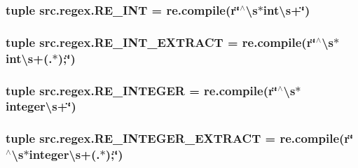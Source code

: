 \hypertarget{namespacesrc_1_1regex_a88a544404f103c3166f2782b063aea3d}{
\subsubsection[{R\-E\-\_\-\-I\-N\-T}]{\setlength{\rightskip}{0pt plus 5cm}tuple src.\-regex.\-R\-E\-\_\-\-I\-N\-T = re.\-compile(r\char`\"{}$^\wedge$\textbackslash{}s$\ast$int\textbackslash{}s+\char`\"{})}}\label{namespacesrc_1_1regex_a88a544404f103c3166f2782b063aea3d}
\hypertarget{namespacesrc_1_1regex_a246819d4a1df3adcc504d309818a23c8}{
\subsubsection[{R\-E\-\_\-\-I\-N\-T\-\_\-\-E\-X\-T\-R\-A\-C\-T}]{\setlength{\rightskip}{0pt plus 5cm}tuple src.\-regex.\-R\-E\-\_\-\-I\-N\-T\-\_\-\-E\-X\-T\-R\-A\-C\-T = re.\-compile(r\char`\"{}$^\wedge$\textbackslash{}s$\ast$int\textbackslash{}s+(.$\ast$);\char`\"{})}}\label{namespacesrc_1_1regex_a246819d4a1df3adcc504d309818a23c8}
\hypertarget{namespacesrc_1_1regex_a3ebbaae008baa0d672050788477a3d51}{
\subsubsection[{R\-E\-\_\-\-I\-N\-T\-E\-G\-E\-R}]{\setlength{\rightskip}{0pt plus 5cm}tuple src.\-regex.\-R\-E\-\_\-\-I\-N\-T\-E\-G\-E\-R = re.\-compile(r\char`\"{}$^\wedge$\textbackslash{}s$\ast$integer\textbackslash{}s+\char`\"{})}}\label{namespacesrc_1_1regex_a3ebbaae008baa0d672050788477a3d51}
\hypertarget{namespacesrc_1_1regex_a89bbbe20930b1ec041718234b9edaf09}{
\subsubsection[{R\-E\-\_\-\-I\-N\-T\-E\-G\-E\-R\-\_\-\-E\-X\-T\-R\-A\-C\-T}]{\setlength{\rightskip}{0pt plus 5cm}tuple src.\-regex.\-R\-E\-\_\-\-I\-N\-T\-E\-G\-E\-R\-\_\-\-E\-X\-T\-R\-A\-C\-T = re.\-compile(r\char`\"{}$^\wedge$\textbackslash{}s$\ast$integer\textbackslash{}s+(.$\ast$);\char`\"{})}}\label{namespacesrc_1_1regex_a89bbbe20930b1ec041718234b9edaf09}
